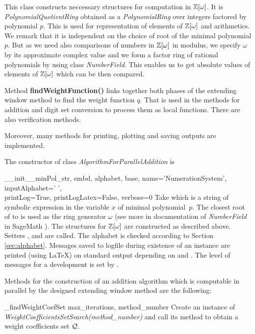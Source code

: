 This class constructs neccessary structures for computation in $\mathbb{Z}[\omega]$. It is \emph{PolynomialQuotientRing} obtained as a \emph{PolynomialRing} over integers factored by polynomial $p$. This is used for representation of elements of $\mathbb{Z}[\omega]$ and arithmetics. We remark that it is independent on the choice of root of the  minimal polynomial $p$. But as we need also comparisons of numbers in $\mathbb{Z}[\omega]$ in modulus, we specify $\omega$ by its approximate complex value and we form a factor ring of rational polynomials by using class \emph{NumberField}. This enables us to get absolute values of elements of $\mathbb{Z}[\omega]$ which can be then compared.

Method \textbf{findWeightFunction()} links together both phases of the extending window method to find the weight function $q$. That is used in the methods for addition and digit set conversion to process them as local functions. There are also verification methods.

Moreover, many methods for printing, plotting and saving outputs are implemented.

The constructor of class \emph{AlgorithmForParallelAddition} is 

\begin{method}{\_\_init\_\_}{minPol\_str, embd, alphabet, base, name='NumerationSystem', inputAlphabet=' ',\\
 printLog=True, printLogLatex=False, verbose=0}
Take  which is a string of symbolic expression in the variable $x$ of minimal polynomial~$p$. The closest root of   to  is used as the ring generator $\omega$ (see more in documentation of \emph{NumberField} in SageMath \cite{sage}). The structures for $\mathbb{Z}[\omega]$ are constructed as described above. Setters ,  and  are called. The alphabet is checked according to Section \ref{sec:alphabet}. Messages saved to logfile during existence of an instance are printed (using \LaTeX) on standard output depending on  and . The level of messages for a development is set by . 
\end{method}

Methods for the construction of an addition algorithm which is computable in parallel by the designed extending window method are the following:

\begin{method}{\_findWeightCoefSet}{ max\_iterations, method\_number}
Create an instance of \emph{WeightCoefficientsSetSearch(method\_number)} and call its method  to obtain a weight coefficients set $\mathcal{Q}$.
\end{method}

